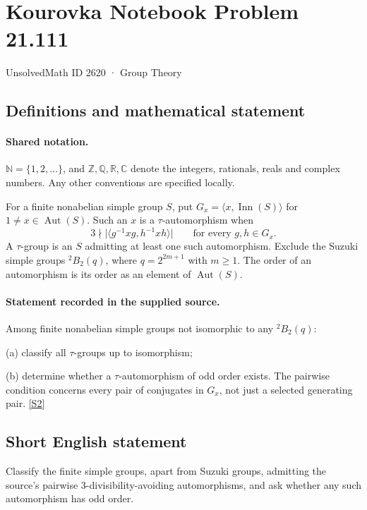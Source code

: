 \documentclass[11pt]{article}
\newcommand{\sref}[2]{\hyperlink{source:#1:#2}{[S#2]}}
\begin{document}
\setcounter{section}{2619}
\section{Kourovka Notebook Problem 21.111}\label{2620}
{\small\sffamily UnsolvedMath ID 2620 · Group Theory}
\subsection{Definitions and mathematical statement}

\paragraph{Shared notation.}$\mathbb N=\{1,2,\ldots\}$, and $\mathbb Z,\mathbb Q,\mathbb R,\mathbb C$ denote the integers, rationals, reals and complex numbers. Any other conventions are specified locally.


For a finite nonabelian simple group $S$, put $G_x=\langle x,\operatorname{Inn}(S)\rangle$ for $1\ne x\in\operatorname{Aut}(S)$. Such an $x$ is a $\tau$-automorphism when
\[
 3\nmid\bigl|\langle g^{-1}xg,h^{-1}xh\rangle\bigr|
 \qquad\text{for every }g,h\in G_x.
\]
A $\tau$-group is an $S$ admitting at least one such automorphism. Exclude the Suzuki simple groups ${}^2B_2(q)$, where $q=2^{2m+1}$ with $m\geq1$. The order of an automorphism is its order as an element of $\operatorname{Aut}(S)$.
\paragraph{Statement recorded in the supplied source.}
Among finite nonabelian simple groups not isomorphic to any ${}^2B_2(q)$:

(a) classify all $\tau$-groups up to isomorphism;

(b) determine whether a $\tau$-automorphism of odd order exists. The pairwise condition concerns every pair of conjugates in $G_x$, not just a selected generating pair. \sref{2620}{2}
\subsection{Short English statement}
Classify the finite simple groups, apart from Suzuki groups, admitting the source’s pairwise 3-divisibility-avoiding automorphisms, and ask whether any such automorphism has odd order.
\end{document}
